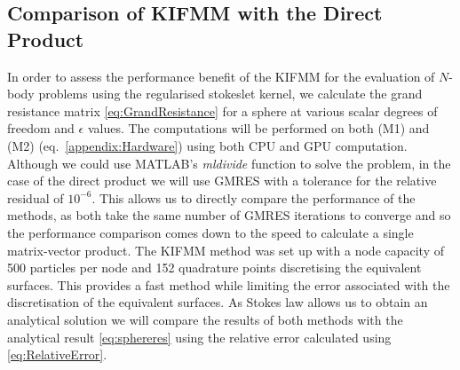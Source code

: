 \subsection{Comparison of KIFMM with the Direct Product}
In order to assess the performance benefit of the KIFMM for the evaluation of $N$-body problems using the regularised stokeslet kernel, we calculate the grand resistance matrix \cref{eq:GrandResistance} for a sphere at various scalar degrees of freedom and $\epsilon$ values. The computations will be performed on both (M1) and (M2) (eq.~\ref{appendix:Hardware}) using both CPU and GPU computation. Although we could use MATLAB's \textit{mldivide} function to solve the problem, in the case of the direct product we will use GMRES with a tolerance for the relative residual of $10^{-6}$. This allows us to directly compare the performance of the methods, as both take the same number of GMRES iterations to converge and so the performance comparison comes down to the speed to calculate a single matrix-vector product. The KIFMM method was set up with a node capacity of 500 particles per node and 152 quadrature points discretising the equivalent surfaces. This provides a fast method while limiting the error associated with the discretisation of the equivalent surfaces. As Stokes law allows us to obtain an analytical solution we will compare the results of both methods with the analytical result \cref{eq:sphereres} using the relative error calculated using \cref{eq:RelativeError}.

